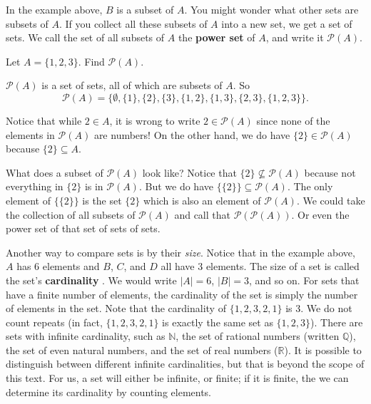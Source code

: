 \documentclass[11pt,]{book}
\newcommand{\terminology}[1]{\textbf{#1}}
\theoremstyle{ptxplainnotitle}
\theoremstyle{ptxplaintitle}
\theoremstyle{ptxdefinitionnotitle}
\theoremstyle{ptxdefinitiontitle}
\theoremstyle{ptxdefinitionnotitle}
\theoremstyle{ptxdefinitiontitle}
\theoremstyle{ptxdefinitionnotitle}
\theoremstyle{ptxdefinitiontitle}
\theoremstyle{ptxdefinitiontitlenonumber}
\theoremstyle{ptxdefinitiontitlenonumber}
\numberwithin{equation}{chapter}
\newcommand{\N}{\mathbb N}
\newcommand{\pow}{\mathcal P}
\begin{document}
\hypertarget{p-734}{}%
In the example above, \(B\) is a subset of \(A\). You might wonder what other sets are subsets of \(A\). If you collect all these subsets of \(A\) into a new set, we get a set of sets. We call the set of all subsets of \(A\) the \terminology{power set}  of \(A\), and write it \(\pow(A)\).%
\begin{example}\label{example-30}
\hypertarget{p-735}{}%
Let \(A = \{1,2,3\}\). Find \(\pow(A)\).%
\par\smallskip%
\noindent\textbf{}\hypertarget{solution-105}{}\hypertarget{p-736}{}%
\(\pow(A)\) is a set of sets, all of which are subsets of \(A\). So%
\begin{equation*}
\pow(A) = \{ \emptyset, \{1\}, \{2\}, \{3\}, \{1,2\}, \{1, 3\}, \{2,3\}, \{1,2,3\}\}.
\end{equation*}
%
\par
\hypertarget{p-737}{}%
Notice that while \(2 \in A\), it is wrong to write \(2 \in \pow(A)\) since none of the elements in \(\pow(A)\) are numbers! On the other hand, we do have \(\{2\} \in \pow(A)\) because \(\{2\} \subseteq A\).%
\par
\hypertarget{p-738}{}%
What does a subset of \(\pow(A)\) look like? Notice that \(\{2\} \not\subseteq \pow(A)\) because not everything in \(\{2\}\) is in \(\pow(A)\). But we do have \(\{ \{2\} \} \subseteq \pow(A)\). The only element of \(\{\{2\}\}\) is the set \(\{2\}\) which is also an element of \(\pow(A)\). We could take the collection of all subsets of \(\pow(A)\) and call that \(\pow(\pow(A))\). Or even the power set of that set of sets of sets.%
\end{example}
\hypertarget{p-739}{}%
Another way to compare sets is by their \emph{size}. Notice that in the example above, \(A\) has 6 elements and \(B\), \(C\), and \(D\) all have 3 elements. The size of a set is called the set's \terminology{cardinality} . We would write \(|A| = 6\), \(|B| = 3\), and so on. For sets that have a finite number of elements, the cardinality of the set is simply the number of elements in the set. Note that the cardinality of \(\{ 1, 2, 3, 2, 1\}\) is 3. We do not count repeats (in fact, \(\{1, 2, 3, 2, 1\}\) is exactly the same set as \(\{1, 2, 3\}\)). There are sets with infinite cardinality, such as \(\N\), the set of rational numbers (written \(\mathbb Q\)), the set of even natural numbers, and the set of real numbers (\(\mathbb R\)). It is possible to distinguish between different infinite cardinalities, but that is beyond the scope of this text. For us, a set will either be infinite, or finite; if it is finite, the we can determine its cardinality by counting elements.%
\end{document}
